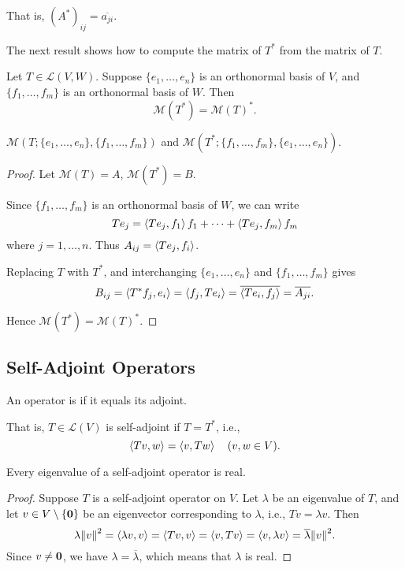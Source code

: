 That is, $(A^*)_{ij}=\overline{a_{ji}}$.

The next result shows how to compute the matrix of $T^*$ from the matrix of $T$.

\begin{lemma}
Let $T\in\mathcal{L}(V,W)$. Suppose $\{e_1,\dots,e_n\}$ is an orthonormal basis of $V$, and $\{f_1,\dots,f_m\}$ is an orthonormal basis of $W$. Then
\[\mathcal{M}(T^*)=\mathcal{M}(T)^*.\]
\end{lemma}

\begin{remark}
$\mathcal{M}(T;\{e_1,\dots,e_n\},\{f_1,\dots,f_m\})$ and $\mathcal{M}(T^*;\{f_1,\dots,f_m\},\{e_1,\dots,e_n\})$.
\end{remark}

\begin{proof}
Let $\mathcal{M}(T)=A$, $\mathcal{M}(T^*)=B$.

Since $\{f_1,\dots,f_m\}$ is an orthonormal basis of $W$, we can write
\[Te_j=\left\langle Te_j,f_1\right\rangle f_1+\cdots+\left\langle Te_j,f_m\right\rangle f_m\]
where $j=1,\dots,n$.
Thus $A_{ij}=\left\langle Te_j,f_i\right\rangle$.

Replacing $T$ with $T^*$, and interchanging $\{e_1,\dots,e_n\}$ and $\{f_1,\dots,f_m\}$ gives
\[B_{ij}=\left\langle T^*f_j,e_i\right\rangle=\left\langle f_j,Te_i\right\rangle=\overline{\left\langle Te_i,f_j\right\rangle}=\overline{A_{ji}}.\]

Hence $\mathcal{M}(T^*)=\mathcal{M}(T)^*$.
\end{proof}
\pagebreak

\subsection{Self-Adjoint Operators}
\begin{definition}
An operator is  if it equals its adjoint.
\end{definition}

That is, $T\in\mathcal{L}(V)$ is self-adjoint if $T=T^*$, i.e.,
\[\left\langle Tv,w\right\rangle=\left\langle v,Tw\right\rangle\quad(v,w\in V).\]

\begin{lemma}\label{lemma:eigenvalue-self-adjoint-real}
Every eigenvalue of a self-adjoint operator is real.
\end{lemma}

\begin{proof}
Suppose $T$ is a self-adjoint operator on $V$. Let $\lambda$ be an eigenvalue of $T$, and let $v\in V\setminus\{\vb{0}\}$ be an eigenvector corresponding to $\lambda$, i.e., $Tv=\lambda v$.
Then
\[\lambda\norm{v}^2
=\left\langle\lambda v,v\right\rangle
=\left\langle Tv,v\right\rangle
=\left\langle v,Tv\right\rangle
=\left\langle v,\lambda v\right\rangle
=\overline{\lambda}\norm{v}^2.\]
Since $v\neq\vb{0}$, we have $\lambda=\overline{\lambda}$, which means that $\lambda$ is real.
\end{proof}

